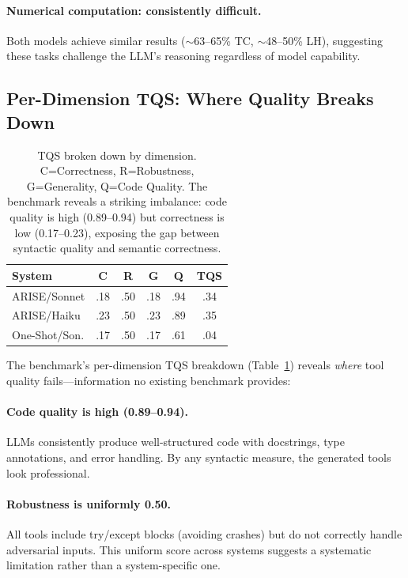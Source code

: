 \documentclass[10pt,twocolumn]{article}
\begin{document}
\paragraph{Numerical computation: consistently difficult.} Both models achieve similar results ($\sim$63--65\% TC, $\sim$48--50\% LH), suggesting these tasks challenge the LLM's reasoning regardless of model capability.

\subsection{Per-Dimension TQS: Where Quality Breaks Down}
\label{sec:tqs_analysis}

\begin{table}[t]
\centering
\footnotesize
\begin{tabular}{lcccc|c}
\toprule
\textbf{System} & \textbf{C} & \textbf{R} & \textbf{G} & \textbf{Q} & \textbf{TQS} \\
\midrule
ARISE/Sonnet & .18 & .50 & .18 & .94 & .34 \\
ARISE/Haiku & .23 & .50 & .23 & .89 & .35 \\
One-Shot/Son. & .17 & .50 & .17 & .61 & .04 \\
\bottomrule
\end{tabular}
\caption{TQS broken down by dimension. C=Correctness, R=Robustness, G=Generality, Q=Code Quality. The benchmark reveals a striking imbalance: code quality is high (0.89--0.94) but correctness is low (0.17--0.23), exposing the gap between syntactic quality and semantic correctness.}
\label{tab:tqs_dims}
\end{table}

The benchmark's per-dimension TQS breakdown (Table~\ref{tab:tqs_dims}) reveals \emph{where} tool quality fails---information no existing benchmark provides:

\paragraph{Code quality is high (0.89--0.94).} LLMs consistently produce well-structured code with docstrings, type annotations, and error handling. By any syntactic measure, the generated tools look professional.

\paragraph{Robustness is uniformly 0.50.} All tools include try/except blocks (avoiding crashes) but do not correctly handle adversarial inputs. This uniform score across systems suggests a systematic limitation rather than a system-specific one.
\end{document}
